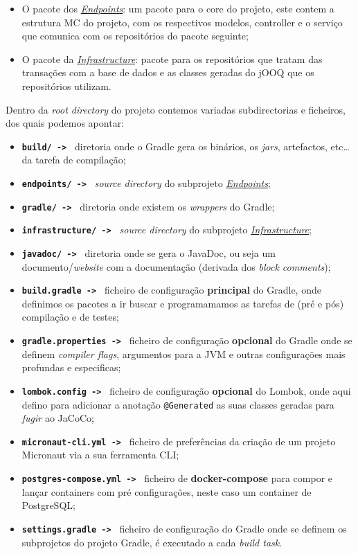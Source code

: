 \begin{itemize}
        \item O pacote dos \hyperref[endp]{\textit{Endpoints}}: um pacote para o core do projeto, este contem a estrutura MC do projeto, com os respectivos modelos, controller e o serviço que comunica com os repositórios do pacote seguinte;
        \item O pacote da \hyperref[infra]{\textit{Infrastructure}}: pacote para os repositórios que tratam das transações com a base de dados e as classes geradas do jOOQ que os repositórios utilizam.
\end{itemize}

Dentro da \textit{root directory} do projeto contemos variadas subdirectorias e ficheiros, dos quais podemos apontar:

\begin{itemize}
        \item \texttt{\textbf{build/ -> }} diretoria onde o Gradle gera os binários, os \textit{jars}, artefactos, etc\ldots da tarefa de compilação;
        \item \texttt{\textbf{endpoints/ -> }} \textit{source directory} do subprojeto \hyperref[endp]{\textit{Endpoints}};
        \item \texttt{\textbf{gradle/ -> }} diretoria onde existem os \textit{wrappers} do Gradle;
        \item \texttt{\textbf{infrastructure/ -> }} \textit{source directory} do subprojeto \hyperref[infra]{\textit{Infrastructure}};
        \item \texttt{\textbf{javadoc/ -> }} diretoria onde se gera o JavaDoc, ou seja um documento/\textit{website} com a documentação (derivada dos \textit{block comments});
        \item \texttt{\textbf{build.gradle -> }} ficheiro de configuração \textbf{principal} do Gradle, onde definimos os pacotes a ir buscar e programamamos as tarefas de (pré e pós) compilação e de testes;
        \item \texttt{\textbf{gradle.properties -> }} ficheiro de configuração \textbf{opcional} do Gradle onde se definem \textit{compiler flags}, argumentos para a JVM e outras configurações mais profundas e especificas;
        \item \texttt{\textbf{lombok.config -> }} ficheiro de configuração \textbf{opcional} do Lombok, onde aqui defino para adicionar a anotação \texttt{@Generated} as suas classes geradas para \textit{fugir} ao JaCoCo;
        \item \texttt{\textbf{micronaut-cli.yml -> }} ficheiro de preferências da criação de um projeto Micronaut via a sua ferramenta CLI;
        \item \texttt{\textbf{postgres-compose.yml -> }} ficheiro de \textbf{docker-compose} para compor e lançar containers com pré configurações, neste caso um container de PostgreSQL;
        \item \texttt{\textbf{settings.gradle -> }} ficheiro de configuração do Gradle onde se definem os subprojetos do projeto Gradle, é executado a cada \textit{build task}.
\end{itemize}

